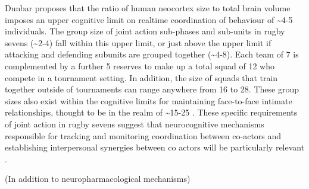 Dunbar \textcite{Dunbar1992} proposes that the ratio of human neocortex size to total brain volume imposes an upper cognitive limit on realtime coordination of behaviour of \sim4-5 individuals.  The group size of joint action sub-phases and sub-units in rugby sevens (\sim2-4) fall within this upper limit, or just above the upper limit if attacking and defending subunits are grouped together (\sim4-8).  Each team of 7 is complemented by a further 5 reserves to make up a total squad of 12 who compete in a tournament setting.  In addition, the size of squads that train together outside of tournaments can range anywhere from 16 to 28.
These group sizes also exist within the cognitive limits for maintaining face-to-face intimate relationships, thought to be in the realm of \sim15-25 \citep{Dunbar1992,Dunbar2010}. These specific requirements of joint action in rugby sevens suggest that neurocognitive mechanisms responsible for tracking and monitoring coordination between co-actors and establishing interpersonal synergies between co actors will be particularly relevant \citep{Mogan2017}.

    (In addition to neuropharmacological mechanisms)



